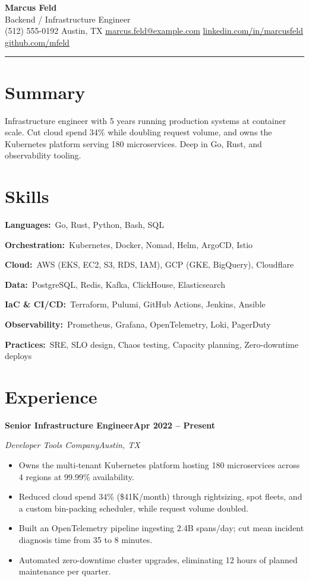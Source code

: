 \documentclass[letterpaper,10pt]{article}
\makeatletter
\newcommand{\csep}{\hspace{5pt}\textbar\hspace{5pt}}
\newcommand{\rRole}[4]{%
  \vspace{3pt}%
  \noindent\textbf{#1}\hfill\textbf{#4}\par
  \noindent\textit{\color{muted}#2}\hfill\textit{\color{muted}#3}\par
  \vspace{1pt}%
}
\newcommand{\rSkill}[2]{\noindent\textbf{#1:}\ #2\par\vspace{1.5pt}}
\newenvironment{rBullets}
  {\begin{itemize}[leftmargin=13pt,itemsep=1pt,parsep=0pt,topsep=2pt,
                   partopsep=0pt,label=\textbullet]}
  {\end{itemize}}
\def\name{Marcus Feld}
\def\role{Backend / Infrastructure Engineer}
\def\phone{(512) 555-0192}
\def\location{Austin, TX}
\def\email{marcus.feld@example.com}
\def\LinkedIn{marcusfeld}
\def\github{mfeld}
\makeatother
\begin{document}
\begin{center}
  {\LARGE\bfseries\color{bodytext}\name}\\[3pt]
  {\large\color{accent}\role}\\[5pt]
  {\small
    \phone\csep
    \location\csep
    \href{mailto:\email}{\email}\csep
    \href{https://linkedin.com/in/\LinkedIn}{linkedin.com/in/\LinkedIn}\csep
    \href{https://github.com/\github}{github.com/\github}}
\end{center}
\vspace{3pt}
{\color{accent}\rule{\linewidth}{1.2pt}}

\section{Summary}
Infrastructure engineer with 5 years running production systems at container
scale. Cut cloud spend 34\% while doubling request volume, and owns the Kubernetes
platform serving 180 microservices. Deep in Go, Rust, and observability tooling.

\section{Skills}
\rSkill{Languages}{Go, Rust, Python, Bash, SQL}
\rSkill{Orchestration}{Kubernetes, Docker, Nomad, Helm, ArgoCD, Istio}
\rSkill{Cloud}{AWS (EKS, EC2, S3, RDS, IAM), GCP (GKE, BigQuery), Cloudflare}
\rSkill{Data}{PostgreSQL, Redis, Kafka, ClickHouse, Elasticsearch}
\rSkill{IaC \& CI/CD}{Terraform, Pulumi, GitHub Actions, Jenkins, Ansible}
\rSkill{Observability}{Prometheus, Grafana, OpenTelemetry, Loki, PagerDuty}
\rSkill{Practices}{SRE, SLO design, Chaos testing, Capacity planning, Zero-downtime deploys}

\section{Experience}

\rRole{Senior Infrastructure Engineer}{Developer Tools Company}{Austin, TX}{Apr 2022 -- Present}
\begin{rBullets}
  \item Owns the multi-tenant Kubernetes platform hosting 180 microservices across 4 regions at 99.99\% availability.
  \item Reduced cloud spend 34\% (\$41K/month) through rightsizing, spot fleets, and a custom bin-packing scheduler, while request volume doubled.
  \item Built an OpenTelemetry pipeline ingesting 2.4B spans/day; cut mean incident diagnosis time from 35 to 8 minutes.
  \item Automated zero-downtime cluster upgrades, eliminating 12 hours of planned maintenance per quarter.
\end{rBullets}
\end{document}
